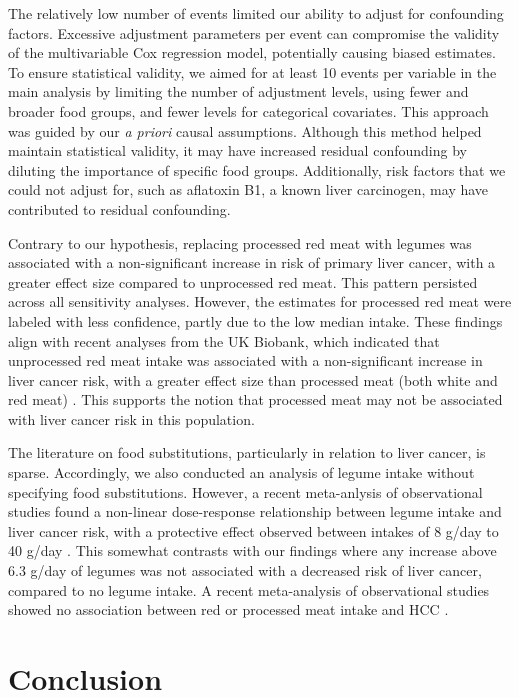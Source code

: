 \documentclass[nutrients,article,submit,moreauthors,pdftex]{Definitions/mdpi}
\begin{document}
The relatively low number of events limited our ability to adjust for
confounding factors. Excessive adjustment parameters per event can
compromise the validity of the multivariable Cox regression model,
potentially causing biased estimates. To ensure statistical validity, we
aimed for at least 10 events per variable in the main analysis by
limiting the number of adjustment levels, using fewer and broader food
groups, and fewer levels for categorical covariates. This approach was
guided by our \emph{a priori} causal assumptions. Although this method
helped maintain statistical validity, it may have increased residual
confounding by diluting the importance of specific food groups.
Additionally, risk factors that we could not adjust for, such as
aflatoxin B1, a known liver carcinogen, may have contributed to residual
confounding.

Contrary to our hypothesis, replacing processed red meat with legumes
was associated with a non-significant increase in risk of primary liver
cancer, with a greater effect size compared to unprocessed red meat.
This pattern persisted across all sensitivity analyses. However, the
estimates for processed red meat were labeled with less confidence,
partly due to the low median intake. These findings align with recent
analyses from the UK Biobank, which indicated that unprocessed red meat
intake was associated with a non-significant increase in liver cancer
risk, with a greater effect size than processed meat (both white and red
meat) \citep{Knuppel2020}. This supports the notion that processed meat
may not be associated with liver cancer risk in this population.

The literature on food substitutions, particularly in relation to liver
cancer, is sparse. Accordingly, we also conducted an analysis of legume
intake without specifying food substitutions. However, a recent
meta-anlysis of observational studies found a non-linear dose-response
relationship between legume intake and liver cancer risk, with a
protective effect observed between intakes of 8 g/day to 40 g/day
\citep{liu2023a}. This somewhat contrasts with our findings where any
increase above 6.3 g/day of legumes was not associated with a decreased
risk of liver cancer, compared to no legume intake. A recent
meta-analysis of observational studies showed no association between red
or processed meat intake and HCC \citep{Di2023}.

\hypertarget{sec5}{%
\section{Conclusion}\label{sec5}}
\end{document}
